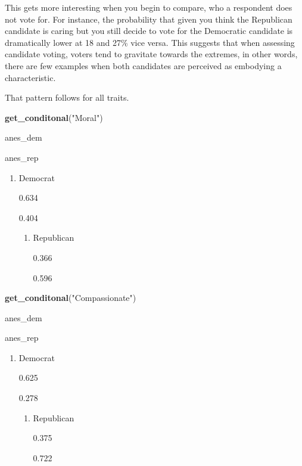 \documentclass[
]{article}
\newenvironment{Shaded}{\begin{snugshade}}{\end{snugshade}}
\newcommand{\KeywordTok}[1]{\textcolor[rgb]{0.13,0.29,0.53}{\textbf{#1}}}
\newcommand{\NormalTok}[1]{#1}
\newcommand{\StringTok}[1]{\textcolor[rgb]{0.31,0.60,0.02}{#1}}
\providecommand{\tightlist}{%
  \setlength{\itemsep}{0pt}\setlength{\parskip}{0pt}}
\begin{document}
This gets more interesting when you begin to compare, who a respondent
does not vote for. For instance, the probability that given you think
the Republican candidate is caring but you still decide to vote for the
Democratic candidate is dramatically lower at 18 and 27\% vice versa.
This suggests that when assessing candidate voting, voters tend to
gravitate towards the extremes, in other words, there are few examples
when both candidates are perceived as embodying a characteristic.

That pattern follows for all traits.

\begin{Shaded}
\begin{Highlighting}[]
\KeywordTok{get_conditonal}\NormalTok{(}\StringTok{"Moral"}\NormalTok{)}
\end{Highlighting}
\end{Shaded}

anes\_dem

anes\_rep

\begin{enumerate}
\def\labelenumi{\arabic{enumi}.}
\tightlist
\item
  Democrat

  {0.634}

  {0.404}

  \begin{enumerate}
  \def\labelenumii{\arabic{enumii}.}
  \setcounter{enumii}{1}
  \tightlist
  \item
    Republican

    {0.366}

    {0.596}
  \end{enumerate}
\end{enumerate}

\begin{Shaded}
\begin{Highlighting}[]
\KeywordTok{get_conditonal}\NormalTok{(}\StringTok{"Compassionate"}\NormalTok{)}
\end{Highlighting}
\end{Shaded}

anes\_dem

anes\_rep

\begin{enumerate}
\def\labelenumi{\arabic{enumi}.}
\tightlist
\item
  Democrat

  {0.625}

  {0.278}

  \begin{enumerate}
  \def\labelenumii{\arabic{enumii}.}
  \setcounter{enumii}{1}
  \tightlist
  \item
    Republican

    {0.375}

    {0.722}
  \end{enumerate}
\end{enumerate}
\end{document}

